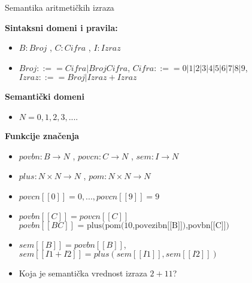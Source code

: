 \documentclass{beamer}
\begin{document}
\begin{frame}{Semantika aritmetičkih izraza}

\begin{tcolorbox}
   \textbf{Sintaksni domeni i pravila:}
\begin{itemize}

\item$B: Broj $ , $C: Cifra $ , $I: Izraz $\\
\item$ Broj ::== Cifra | Broj Cifra $, $ Cifra ::== 0 | 1 | 2 | 3 | 4 | 5 | 6 | 7 | 8 | 9 $, $ Izraz ::== Broj | Izraz+Izraz $
\end{itemize}
   \textbf{Semantički domeni}
\begin{itemize}
\item $N={0,1,2,3,....} $\\
\end{itemize}
\end{tcolorbox}

\end{frame}
\begin{frame}
\begin{tcolorbox}
    \textbf{Funkcije značenja}
\begin{itemize}
\item $povbn: B \rightarrow N $ , $povcn: C \rightarrow N $ , $sem: I \rightarrow N $   \\

\item $plus: N \times N \rightarrow N $ , $pom: N \times N \rightarrow N $ \\

\item $ povcn[[0]] = 0,... ,povcn[[9]] = 9 $\\

\item $ povbn[[C]] = povcn[[C]] $\\
$ povbn[[B C]]\mbox{ = plus(pom(10,povezibn[[B]]),povbn[[C]])} $

\item $ sem[[B]] = povbn[[B]] $, $ sem[[I1 + I2]] = plus(sem[[I1]],sem[[I2]]) $
\end{itemize}
 
\end{tcolorbox}

\begin{itemize}
\item Koja je semantička vrednost izraza $2 + 11$?
\end{itemize}
\end{frame}
\end{document}
